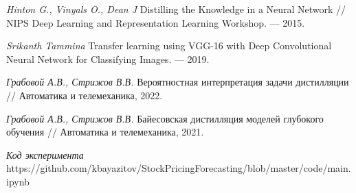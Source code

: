 \newpage


\begin{thebibliography}{99}

    \textit{Hinton G., Vinyals O., Dean J} Distilling the Knowledge in a Neural Network // NIPS Deep Learning and Representation Learning Workshop. — 2015.
    
    \textit{Srikanth Tammina} Transfer learning using VGG-16 with Deep
    Convolutional Neural Network for Classifying Images. --- 2019.
    
    \textit{Грабовой А.В., Стрижов В.В.} Вероятностная интерпретация задачи дистилляции // Автоматика и телемеханика, 2022.
    
    \textit{Грабовой А.В., Стрижов В.В.} Байесовская дистилляция моделей глубокого обучения // Автоматика и телемеханика, 2021.
    
    \textit{Код эксперимента}\\ https://github.com/kbayazitov/StockPricingForecasting/blob/master/code/main.ipynb
	
\end{thebibliography}
